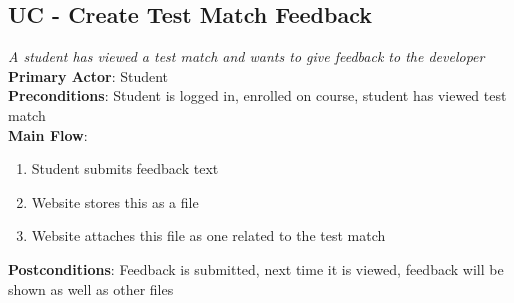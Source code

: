 \documentclass[a4paper,11pt]{report}
\begin{document}
\subsection*{UC - Create Test Match Feedback}
\textit{A student has viewed a test match and wants to give feedback to the developer}\\
\textbf{Primary Actor}: Student\\
\textbf{Preconditions}: Student is logged in, enrolled on course, student has viewed test match\\
\textbf{Main Flow}:
\begin{enumerate}
\item Student submits feedback text
\item Website stores this as a file
\item Website attaches this file as one related to the test match
\end{enumerate}
\textbf{Postconditions}: Feedback is submitted, next time it is viewed, feedback will be shown as well as other files
\end{document}
